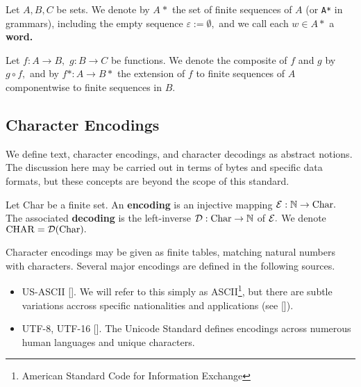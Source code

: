 Let $A, B, C$ be sets. We denote by $A^{}*$ the set of finite sequences of $A$ (or \texttt{A*} in grammars), including the empty sequence $\varepsilon := \emptyset,$ and we call each $w \in A*$ a \textbf{word.}

Let $f: A \to B,$ $g: B \to C$ be functions. We denote the composite of $f$ and $g$ by $g \circ f,$ and by $f*: A \to B*$ the extension of $f$ to finite sequences of $A$ componentwise to finite sequences in $B.$


\subsection{Character Encodings}
We define text, character encodings, and character decodings as abstract notions. The discussion here may be carried out in terms of bytes and specific data formats, but these concepts are beyond the scope of this standard.

Let Char be a finite set. An \textbf{encoding} is an injective mapping $\mathcal{E} : \mathbb{N} \to \textrm{Char}.$ The associated \textbf{decoding} is the left-inverse $\mathcal{D}: \mathrm{Char} \to \mathbb{N}$ of $\mathcal{E}.$ We denote $\mathrm{CHAR} = \mathcal{D}(\textrm{Char}).$

Character encodings may be given as finite tables, matching natural numbers with characters. Several major encodings are defined in the following sources.
\begin{itemize}
	\item US-ASCII []. We will refer to this simply as ASCII\footnote{American Standard Code for Information Exchange}, but there are subtle variations accross specific nationalities and applications (see []).
	\item UTF-8, UTF-16 []. The Unicode Standard defines encodings across numerous human languages and unique characters.  %
\end{itemize}


